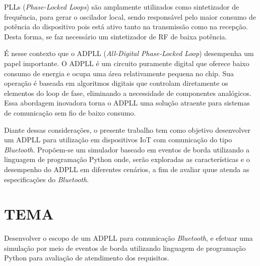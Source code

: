 PLLs (\textit{Phase-Locked Loops}) são amplamente utilizados como sintetizador de frequência, para gerar o oscilador local, sendo responsável pelo maior consumo de potência do dispositivo pois está ativo tanto na transmissão como na recepção. Desta forma, se faz necessário um sintetizador de RF de baixa potência.

É nesse contexto que o ADPLL (\textit{All-Digital Phase-Locked Loop}) desempenha um papel importante. O ADPLL é um circuito puramente digital que oferece baixo consumo de energia e ocupa uma área relativamente pequena no chip. Sua operação é baseada em algoritmos digitais que controlam diretamente os elementos do loop de fase, eliminando a necessidade de componentes analógicos. Essa abordagem inovadora torna o ADPLL uma solução atraente para sistemas de comunicação sem fio de baixo consumo.

Diante dessas considerações, o presente trabalho tem como objetivo desenvolver um ADPLL para utilização em dispositivos IoT com comunicação do tipo \textit{Bluetooth}.  Propõem-se um simulador baseado em eventos de borda utilizando a linguagem de programação Python onde, serão exploradas as características e o desempenho do ADPLL em diferentes cenários, a fim de avaliar quue atenda as especificações do \textit{Bluetooth}.




\section{TEMA} 

Desenvolver o escopo de um ADPLL para comunicação \textit{Bluetooth}, e efetuar uma simulação por meio de eventos de borda utilizando linguagem de programação Python para avaliação de atendimento dos requisitos.

